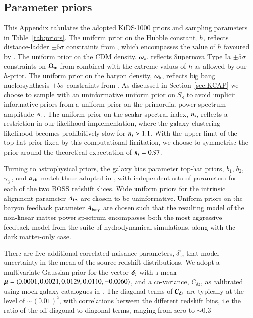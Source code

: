 \begin{appendix}
\section{Parameter priors}
\label{app:priors}
This Appendix tabulates the adopted KiDS-1000 priors and sampling parameters in Table~\ref{tab:priors}.   The uniform prior on the Hubble constant, $h$, reflects distance-ladder $\pm 5 \sigma$ constraints from \citet{riess/etal:2016}, which encompasses the value of $h$ favoured by \citet{planck/etal:2018}.  The uniform prior on the CDM density, $\omega_{\rm c}$, reflects Supernova Type Ia $\pm 5 \sigma$ constraints on $\Omega_{\rm m}$ from \citet{scolnic/etal:2018} combined with the extreme values of $h$ as allowed by our $h$-prior.   The uniform prior on the baryon density, $\omega_{\rm b}$, reflects big bang nucleosynthesis $\pm 5 \sigma$ constraints from \citet{olive/etal:2014}.   As discussed in Section~\ref{sec:KCAP} we choose to sample with an uninformative uniform prior on $S_8$ to avoid implicit informative priors from a uniform prior on the primordial power spectrum amplitude $A_{\rm s}$.    The uniform prior on the scalar spectral index, $n_{\rm s}$, reflects a restriction in our likelihood implementation, where the \citet{sanchez/etal:2017} galaxy clustering likelihood becomes prohibitively slow for $n_{\rm s}>1.1$.  With the upper limit of the top-hat prior fixed by this computational limitation, we choose to symmetrise the prior around the theoretical expectation of $n_{\rm s}=0.97$.  

Turning to astrophysical priors, the galaxy bias parameter top-hat priors, $b_1$, $b_2$,  $\gamma_3^-$, and $a_{\rm vir}$ match those adopted in \citet{sanchez/etal:2017}, with independent sets of parameters for each of the two BOSS redshift slices.   Wide uniform priors for the intrinsic alignment parameter $A_{\rm IA}$ are chosen to be uninformative.    Uniform priors on the baryon feedback parameter $A_{\rm bary}$ are chosen such that the resulting \citet{mead/etal:2015} model of the non-linear matter power spectrum encompasses both the most aggressive feedback model from the \citet{vandaalen/etal:2011} suite of hydrodynamical simulations, along with the dark matter-only case.

There are five additional correlated nuisance parameters, $\delta^i_z$, that model uncertainty in the mean of the source redshift distributions.  We adopt a multivariate Gaussian prior for the vector $\mbox{\boldmath $\delta$}_z$ with a mean $\mbox{\boldmath $\mu$} = (0.0001,0.0021,0.0129,0.0110,-0.0060)$, and a co-variance, $C_{\delta z}$, as calibrated using mock galaxy catalogues in \citet{wright/etal:2020}.   The diagonal terms of $\mbox{\boldmath $C$}_{\delta z}$ are typically at the level of $\sim(0.01)^2$, with correlations between the different redshift bins, i.e the ratio of the off-diagonal to diagonal terms,  ranging from zero to $\sim 0.3$ \citep[see section 3.3 of][for details]{joachimi/etal:inprep}.



\end{appendix}

